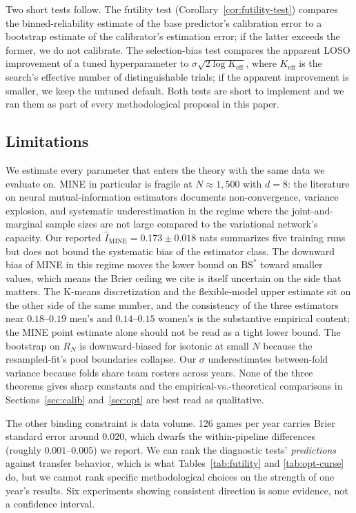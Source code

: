 \documentclass[11pt,a4paper]{article}
\theoremstyle{definition}
\newcommand{\BS}{\mathrm{BS}}
\begin{document}
Two short tests follow. The futility test (Corollary~\ref{cor:futility-test}) compares the binned-reliability estimate of the base predictor's calibration error to a bootstrap estimate of the calibrator's estimation error; if the latter exceeds the former, we do not calibrate. The selection-bias test compares the apparent LOSO improvement of a tuned hyperparameter to $\sigma \sqrt{2 \log K_{\text{eff}}}$, where $K_{\text{eff}}$ is the search's effective number of distinguishable trials; if the apparent improvement is smaller, we keep the untuned default. Both tests are short to implement and we ran them as part of every methodological proposal in this paper.

\subsection{Limitations}

We estimate every parameter that enters the theory with the same data we evaluate on. MINE in particular is fragile at $N \approx 1{,}500$ with $d = 8$: the literature on neural mutual-information estimators \citep{songermon2020, mcallester2020} documents non-convergence, variance explosion, and systematic underestimation in the regime where the joint-and-marginal sample sizes are not large compared to the variational network's capacity. Our reported $\hat I_{\text{MINE}} = 0.173 \pm 0.018$ nats summarizes five training runs but does not bound the systematic bias of the estimator class. The downward bias of MINE in this regime moves the lower bound on $\BS^*$ toward smaller values, which means the Brier ceiling we cite is itself uncertain on the side that matters. The K-means discretization and the flexible-model upper estimate sit on the other side of the same number, and the consistency of the three estimators near $0.18$--$0.19$ men's and $0.14$--$0.15$ women's is the substantive empirical content; the MINE point estimate alone should not be read as a tight lower bound. The bootstrap on $R_N$ is downward-biased for isotonic at small $N$ because the resampled-fit's pool boundaries collapse. Our $\sigma$ underestimates between-fold variance because folds share team rosters across years. None of the three theorems gives sharp constants and the empirical-vs.-theoretical comparisons in Sections~\ref{sec:calib} and~\ref{sec:opt} are best read as qualitative.

The other binding constraint is data volume. 126 games per year carries Brier standard error around $0.020$, which dwarfs the within-pipeline differences (roughly $0.001$--$0.005$) we report. We can rank the diagnostic tests' \emph{predictions} against transfer behavior, which is what Tables~\ref{tab:futility} and \ref{tab:opt-curse} do, but we cannot rank specific methodological choices on the strength of one year's results. Six experiments showing consistent direction is some evidence, not a confidence interval.
\end{document}
